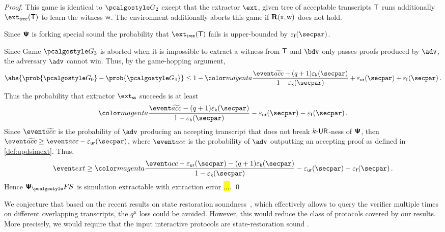 \begin{proof}
 This game is identical to $\game{2}$ except that the extractor $\ext$,
given tree of acceptable transcripts $\mathsf{T}$ runs additionally $\extt (\tree)$ to
learn the witness $\mathsf{w}$. The environment additionally aborts this game if
$\mathbf{R}(\mathsf{x}, \mathsf{w})$ does not hold.
	
		Since $\bm{\mathsf{\Psi}}$ is forking special sound the probability that $\extt(\tree)$
		fails is upper-bounded by $\epsss(\secpar)$.
		
     Since Game $\game{3}$ is aborted when it is impossible to
    extract a witness from $\mathsf{T}$ and $\bdv$ only passes proofs produced by $\adv$,
    the adversary $\advse$ cannot win. Thus, by the game-hopping argument,
		\[
      \abs{\prob{\game{0}} - \prob{\game{4}}} \leq 1 - \changedm{\frac{\waccProb - (q
          + 1) \epsk(\secpar)}{1 - \epsk(\secpar)}} + \epsur(\secpar) +
		\epsss(\secpar)\,.
		\]
		Thus the probability that extractor $\extss$ succeeds is at least
		\[
      \changedm{\frac{\waccProb - (q + 1) \epsk(\secpar)}{1 - \epsk(\secpar)}} -
      \epsur(\secpar)
		- \epsss(\secpar)\,.
		\]
		Since $\waccProb$ is the probability of $\advse$ producing an accepting transcript
		that does not break ${k\text{-}\mathsf{UR}}$-ness of $\bm{\mathsf{\Psi}}$, then $\waccProb \geq \accProb -
		\epsur(\secpar)$, where $\accProb$ is the probability of $\advse$ outputting an accepting
		proof as defined in \cref{def:updsimext}. Thus, 
		\begin{equation}
      \label{eq:frk}
      \extProb \geq \changedm{\frac{\accProb - \epsur(\secpar) - (q + 1) \epsk(\secpar)}{1 - \epsk(\secpar)}} 
      - \epsur(\secpar) - \epsss(\secpar)\,.
		\end{equation}
		Hence $\psfs$ is simulation extractable with extraction error \hl{...}. 
	\qed
\end{proof}


We conjecture that based on the recent results on state restoration
soundness~\cite{C:GhoTes21}, which effectively allows to query the verifier multiple
times on different overlapping transcripts, the $q^{\mu}$ loss could be
avoided. However, this would reduce the class of protocols covered by our
results. More precisely, we would require that the input interactive protocols are
state-restoration sound \cite{TCC:BenChiSpo16}.

